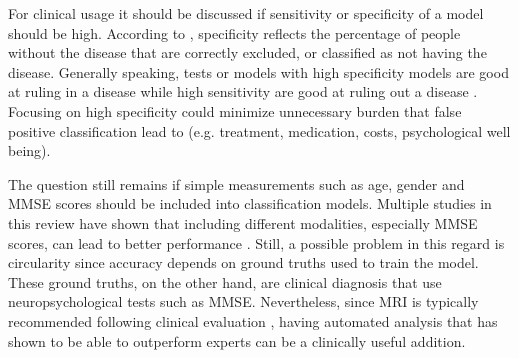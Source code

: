 For clinical usage it should be discussed if sensitivity or specificity of a model should be high. According to \textcite{BORST202015}, specificity reflects the percentage of people without the disease that are correctly excluded, or classified as not having the disease. Generally speaking, tests or models with high specificity models are good at ruling in a disease while high sensitivity are good at ruling out a disease \autocite{BORST202015}. Focusing on high specificity could minimize unnecessary burden that false positive classification lead to (e.g. treatment, medication, costs, psychological well being).

The question still remains if simple measurements such as age, gender and MMSE scores should be included into classification models. Multiple studies in this review have shown that including different modalities, especially MMSE scores, can lead to better performance  \autocite[see][]{khatriEfficientCombinationSMRI2020a,akramifardEmphasisLearningFeatures2020}. Still, a possible problem in this regard is circularity since accuracy depends on ground truths used to train the model. These ground truths, on the other hand, are clinical diagnosis that use neuropsychological tests such as MMSE. Nevertheless, since MRI is typically recommended following clinical evaluation \autocite{SCHELTENS2021}, having automated analysis that has shown to be able to outperform experts \autocite[e.g.][]{syaifullahMachineLearningDiagnosis2021} can be a clinically useful addition. 





